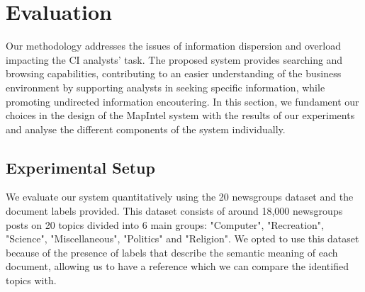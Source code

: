 \documentclass[a4paper]{article}
\begin{document}
\section{Evaluation}
Our methodology addresses the issues of information dispersion and overload impacting the CI analysts' task. The proposed system provides searching and browsing capabilities, contributing to an easier understanding of the business environment by supporting analysts in seeking specific information, while promoting undirected information encoutering. In this section, we fundament our choices in the design of the MapIntel system with the results of our experiments and analyse the different components of the system individually.

\subsection{Experimental Setup}
We evaluate our system quantitatively using the 20 newsgroups \citep{pedregosa2011} dataset and the document labels provided. This dataset consists of around 18,000 newsgroups posts on 20 topics divided into 6 main groups: "Computer", "Recreation", "Science", "Miscellaneous", "Politics" and "Religion". We opted to use this dataset because of the presence of labels that describe the semantic meaning of each document, allowing us to have a reference which we can compare the identified topics with.
\end{document}
